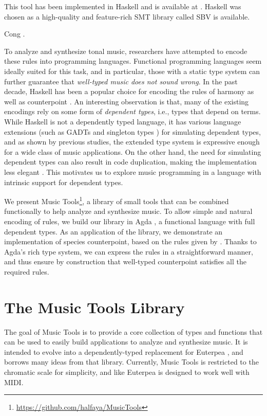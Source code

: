 \documentclass[sigplan,screen]{acmart}
\begin{document}
This tool has been implemented in Haskell and is available at
\cite{HaskellCounterpoint}. Haskell was chosen as a high-quality and
feature-rich SMT library called SBV \citep{SBV} is available.


Cong \citep{Cong2022a}.

To analyze and synthesize tonal music, researchers have
attempted to encode these rules into programming languages.
Functional programming languages seem
ideally suited for this task, and in particular, those with a static
type system can further guarantee that \emph{well-typed music 
does not sound wrong}.
In the past decade, Haskell has been a popular choice for encoding
the rules of harmony \citep{fmmh, hihseufha, faamh, hafha, fghm}
as well as counterpoint \citep{szamozvancev2017well}.
An interesting observation is that, many of the existing encodings
rely on some form of \emph{dependent types}, i.e.,  
types that depend on terms. 
While Haskell is not a dependently typed language, it has various 
language extensions (such as GADTs \citep{cheney2002lightweight} 
and singleton types \citep{eisenberg2013dependently}) for 
simulating dependent types, and as shown by previous studies,
the extended type system is expressive enough for 
a wide class of music applications.
On the other hand, the need for simulating dependent types 
can also result in code duplication, making the implementation 
less elegant \citep{monnier2010singleton}.
This motivates us to explore music programming in a language
with intrinsic support for dependent types.

We present Music Tools\footnote{\url{https://github.com/halfaya/MusicTools}},
a library of small tools that can be combined functionally to 
help analyze and synthesize music.
To allow simple and natural encoding of rules, we build our 
library in Agda \citep{norellphd}, a functional language with full dependent types.
As an application of the library, we demonstrate an
implementation of species counterpoint, based on the rules 
given by \citet{Fux1965}.
Thanks to Agda's rich type system, we can express 
the rules in a straightforward manner, and thus ensure by 
construction that well-typed counterpoint satisfies all the 
required rules.


\section{The Music Tools Library}

The goal of Music Tools is to provide a core collection of types and functions
that can be used to easily build applications to analyze and synthesize music.
It is intended to evolve into a dependently-typed replacement for Euterpea
\citep{hudak2018haskell}, and borrows many ideas from that library.
Currently, Music Tools is restricted to the chromatic scale for simplicity, 
and like Euterpea is designed to work well with MIDI.
\end{document}
